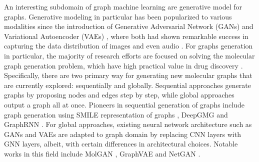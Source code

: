 An interesting subdomain of graph machine learning are generative model for graphs. Generative modeling in particular has been popularized to various modalities since the introduction of Generative Adversarial Network (GANs) \cite{goodfellowGenerativeAdversarialNetworks2014} and Variational Autoencoder (VAEs) \cite{kingmaAutoEncodingVariationalBayes2014}, where both had shown remarkable success in capturing the data distribution of images and even audio \cite{hersheyCNNArchitecturesLargescale2017}. For graphs generation in particular, the majority of research efforts are focused on solving the molecular graph generation problem, which have high practical value in drug discovery \cite{wuComprehensiveSurveyGraph2021}. Specifically, there are two primary way for generating new molecular graphs that are currently explored: sequentially and globally. Sequential approaches generate graphs by proposing nodes and edges step by step, while global approaches output a graph all at once. Pioneers in sequential generation of graphs include graph generation using SMILE representation of graphs \cite{daiSyntaxdirectedVariationalAutoencoder2018, kusnerGrammarVariationalAutoencoder2017, gomez-bombarelliAutomaticChemicalDesign2018}, DeepGMG \cite{liLearningDeepGenerative2018} and GraphRNN \cite{youGraphRNNGeneratingRealistic2018}. For global approaches, existing neural network architecture such as GANs and VAEs are adapted to graph domain by replacing CNN layers with GNN layers, albeit, with certain differences in architectural choices. Notable works in this field include MolGAN \cite{decaoMolGANImplicitGenerative2018}, GraphVAE \cite{simonovskyGraphVAEGenerationSmall2018} and NetGAN \cite{bojchevskiNetGANGeneratingGraphs2018}.

